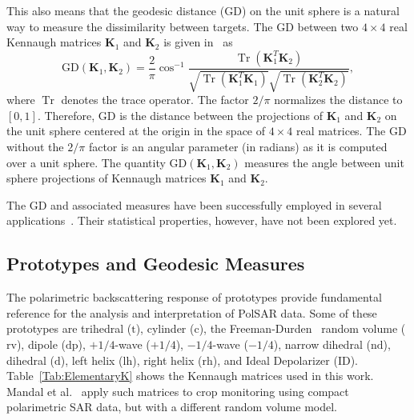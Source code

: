 \documentclass[journal]{IEEEtran}
\DeclareMathOperator{\Tr}{Tr}
\begin{document}
	
	This also means that the geodesic distance ($\text{GD}$) on the unit sphere is a natural way to measure the dissimilarity between targets. The $\text{GD}$ between two $4 \times 4$ real Kennaugh matrices $\bm{K}_1$ and $\bm{K}_2$ is given in~\cite{APolSARScatteringPowerFactorizationFrameworkandNovelRollInvariantParametersBasedUnsupervisedClassificationSchemeUsingaGeodesicDistanceinpress} as
	\begin{equation}
		\text{GD}(\bm{K}_1,\bm{K}_2) =  \frac{2}{\pi} \cos^{-1}\frac{\Tr(\bm{K}_1^T\bm{K}_2)}{\sqrt{\Tr(\bm{K}_1^T\bm{K}_1)}\sqrt{\Tr(\bm{K}_2^T\bm{K}_2)}} ,
		\label{eq:GD_Ken}
	\end{equation}
	where $\Tr$ denotes the trace operator. 
	The factor $2/\pi$ normalizes the distance to $[0,1]$. 
	Therefore, $\text{GD}$ is the distance between the projections of $\bm{K}_1$ and $\bm{K}_2$ on the unit sphere centered at the origin in the space of $4 \times 4$ real matrices. 
	The $\text{GD}$ without the $2/\pi$ factor is an angular parameter (in radians) as it is computed over a unit sphere. 
	The quantity $\text{GD}(\bm{K}_1, \bm{K}_2)$ measures the angle between unit sphere projections of Kennaugh matrices $\bm{K}_1$ and  $\bm{K}_2$.
	
	The GD and associated measures have been successfully employed in several applications~\cite{ClassificationPolSARGeodesic,AGeneralizedVolumeScatteringModelBasedVegetationIndexfromPolarimetricSARData2019,NovelTechniquesforBuiltupAreaExtractionfromPolarimetricSARImages2019,APolSARScatteringPowerFactorizationFrameworkandNovelRollInvariantParametersBasedUnsupervisedClassificationSchemeUsingaGeodesicDistanceinpress,ChangeDetectionPolSARGeodesicDistanceBetweenScatteringMechanisms,ARadarVegetationIndexforCropMonitoringUsingCompactPolarimetricSARData}. Their statistical properties, however, have not been explored yet.%
	\subsection{Prototypes and Geodesic Measures}
	
	The polarimetric backscattering response of prototypes provide fundamental reference for the  analysis and interpretation of PolSAR data.
	Some of these prototypes are
	{trihedral} ($\text{t}$),
	{cylinder} (${\text{c}}$),
	the Freeman-Durden~\cite{freeman98} random volume (${\text{rv}}$),
	{dipole} (${\text{dp}}$),
	{$+1/4$-wave} (${+1/4}$), 
	{$-1/4$-wave} (${-1/4}$),
	{narrow dihedral} (${\text{nd}}$),
	{dihedral} (${\text{d}}$),
	{left helix} (${\text{lh}}$), 
	{right helix} (${\text{rh}}$), 
	and Ideal Depolarizer (${\text{ID}}$).
	Table~\ref{Tab:ElementaryK} shows the Kennaugh matrices used in this work. 
	Mandal et al.~\cite{ARadarVegetationIndexforCropMonitoringUsingCompactPolarimetricSARData} apply such matrices to crop monitoring using compact polarimetric SAR data, but with a different random volume model.
	
\end{document}
